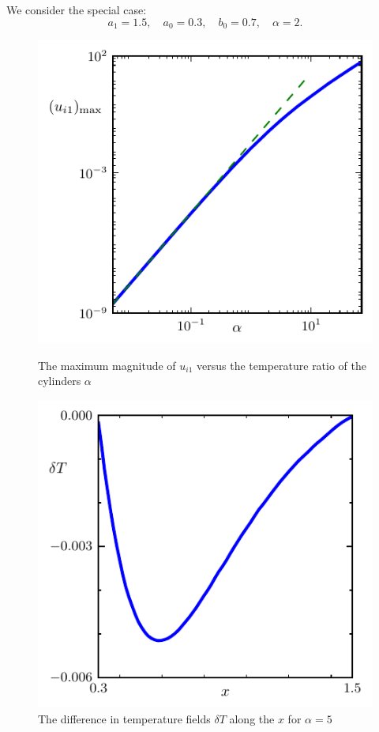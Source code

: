\documentclass[smallextended, referee]{svjour3} %
\begin{document}
We consider the special case:
\[ a_1 = 1.5, \quad a_0 = 0.3, \quad b_0 = 0.7, \quad \alpha = 2. \]

\begin{figure}[ht]
	\centering
	\begin{minipage}{.48\textwidth}
		\centering
		\includegraphics{Fig10}
		\caption{The maximum magnitude of \(u_{i1}\) versus the temperature ratio of the cylinders \(\alpha\)}
		\label{fig:maxU}
	\end{minipage}
	\quad
	\begin{minipage}{.48\textwidth}
		\centering
		\includegraphics{Fig11}
		\caption{The difference in temperature fields \(\delta T\) along the \(x\) for \(\alpha = 5\)}
		\label{fig:deltaT}
	\end{minipage}
\end{figure}
\end{document}
